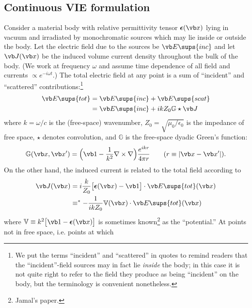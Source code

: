 \documentclass[letterpaper]{article}
\newcommand{\vbeps}{\boldsymbol{\epsilon}}
\begin{document}
\subsection*{Continuous VIE formulation}

Consider a material body with relative permittivity tensor
$\vbeps(\vb x)$ lying in vacuum and irradiated by monochromatic
sources which may lie inside or outside the body. 
Let the electric field due to the sources be $\vb E\sups{inc}$ 
and let $\vb J(\vb x)$ be the induced volume current
density throughout the bulk of the body. 
(We work at frequency $\omega$ and assume time dependence
of all field and currents $\propto e^{-i\omega t}$.)
The total electric field at any point is a sum of
``incident'' and ``scattered'' contributions:\footnote{We
put the terms ``incident'' and ``scattered'' in quotes
to remind readers that the ``incident''-field sources may
in fact lie \textit{inside} the body; in this case it is 
not quite right to refer to the field they produce as 
being ``incident'' on the body, but the terminology is 
convenient nonetheless.}
\begin{align}
 \vb E\sups{tot} &= \vb E\sups{inc} + \vb E\sups{scat}
\\
                 &= \vb E\sups{inc} + ikZ_0 \mathbb{G}\star\vb J
\label{ETot}
\end{align}
where $k=\omega/c$ is the (free-space) wavenumber,
$Z_0=\sqrt{\mu_0/\epsilon_0}$ is the impedance of free space,
$\star$ denotes convolution, and $\mathbb{G}$ is the free-space
dyadic Green's function:
$$ \mathbb{G}(\vb x, \vb x^\prime) = 
   \Big(\vb 1 - \frac{1}{k^2} \nabla \times \nabla \Big)
   \frac{e^{ikr}}{4\pi r}
   \qquad (r\equiv |\vb x-\vb x^\prime|).
$$
On the other hand, the induced current is related to the total field
according to
\begin{align*}
 \vb J(\vb x) 
&= i\frac{k}{Z_0} \big[\vbeps(\vb x) - \vb 1\big]\cdot \vb E\sups{tot}(\vb x)
\\
&\equiv^* -\frac{1}{ikZ_0} \mathbb{V}(\vb x) \cdot \vb E\sups{tot}(\vb x)
\end{align*}
where $\mathbb{V}\equiv k^2\big[\vb 1 - \vbeps(\vb x)\big]$ is
sometimes known\footnote{Jamal's paper.} as the ``potential.''
At points not in free space, i.e. points at which 
\end{document}
